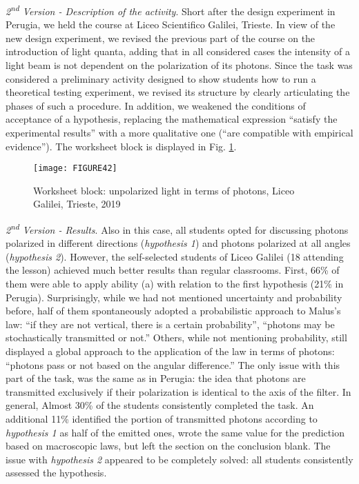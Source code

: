 \documentclass[twocolumn,secnumarabic,amssymb, nobibnotes, aps, prd, nofootinbib]{revtex4-2}
\begin{document}
\emph{2\textsuperscript{nd} Version - Description of the activity}. Short after the design experiment in Perugia, we held the course at Liceo Scientifico Galilei, Trieste. In view of the new design experiment, we revised the previous part of the course on the introduction of light quanta, adding that in all considered cases the intensity of a light beam is not dependent on the polarization of its photons. Since the task was considered a preliminary activity designed to show students how to run a theoretical testing experiment, we revised its structure by clearly articulating the phases of such a procedure. In addition, we weakened the conditions of acceptance of a hypothesis, replacing the mathematical expression ``satisfy the experimental results'' with a more qualitative one (``are compatible with empirical evidence'').  The worksheet block is displayed in Fig. \ref{FIG:42}.
\begin{figure}[!htpb]
    \texttt{[image: FIGURE42]}
    \caption{Worksheet block: unpolarized light in terms of photons, Liceo Galilei, Trieste, 2019}
    \label{FIG:42}
\end{figure}

\emph{2\textsuperscript{nd} Version - Results}. Also in this case, all students opted for discussing photons polarized in different directions (\textit{hypothesis 1}) and photons polarized at all angles (\textit{hypothesis 2}). However, the self-selected students of Liceo Galilei (18 attending the lesson) achieved much better results than regular classrooms. First, 66\% of them were able to apply ability (a) with relation to the first hypothesis (21\% in Perugia). Surprisingly, while we had not mentioned uncertainty and probability before, half of them spontaneously adopted a probabilistic approach to Malus's law: ``if they are not vertical, there is a certain probability'', ``photons may be stochastically transmitted or not.'' Others, while not mentioning probability, still displayed a global approach to the application of the law in terms of photons: ``photons pass or not based on the angular difference.'' The only issue with this part of the task, was the same as in Perugia: the idea that photons are transmitted exclusively if their polarization is identical to the axis of the filter. In general, Almost 30\% of the students consistently completed the task. An additional 11\% identified the portion of transmitted photons according to \textit{hypothesis 1} as half of the emitted ones, wrote the same value for the prediction based on macroscopic laws, but left the section on the conclusion blank. The issue with \textit{hypothesis 2} appeared to be completely solved: all students consistently assessed the hypothesis.
\end{document}
